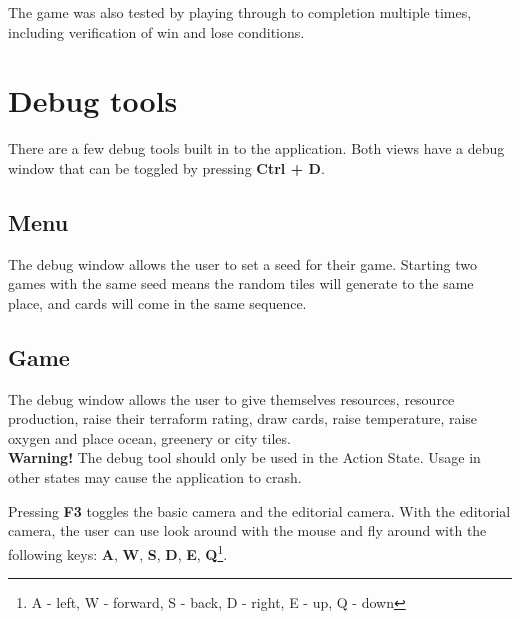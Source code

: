 The game was also tested by playing through to completion multiple times, including verification of win and lose conditions.


\section{Debug tools}

There are a few debug tools built in to the application. Both views have a debug window that can be toggled by pressing \textbf{Ctrl + D}.

\subsection{Menu}

The debug window allows the user to set a seed for their game. Starting two games with the same seed means the random tiles will generate to the same place, and cards will come in the same sequence.

\subsection{Game}

The debug window allows the user to give themselves resources, resource production, raise their terraform rating, draw cards, raise temperature, raise oxygen and place ocean, greenery or city tiles. \\
\textbf{Warning!} The debug tool should only be used in the Action State. Usage in other states may cause the application to crash.

Pressing \textbf{F3} toggles the basic camera and the editorial camera. With the editorial camera, the user can use look around with the mouse and fly around with the following keys: \textbf{A}, \textbf{W}, \textbf{S}, \textbf{D}, \textbf{E}, \textbf{Q}\footnote{A - left, W - forward, S - back, D - right, E - up, Q - down}.
